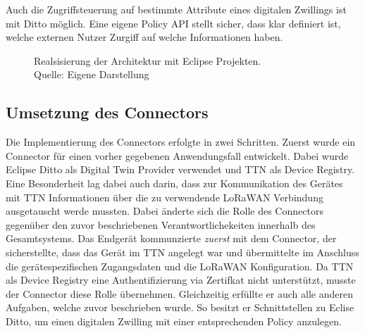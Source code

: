 Auch die Zugriffsteuerung auf bestimmte Attribute eines digitalen Zwillings ist mit Ditto möglich. Eine eigene Policy API stellt sicher, dass klar definiert ist, welche externen Nutzer Zurgiff auf welche Informationen haben. 

\begin{figure}
    \centering
    \caption[Realisierung der Architektur mit Eclipse Projekten]{Realsisierung der Architektur mit Eclipse Projekten.\\Quelle: Eigene Darstellung}
\end{figure}

\subsection{Umsetzung des Connectors}

Die Implementierung des Connectors erfolgte in zwei Schritten. Zuerst wurde ein Connector für einen vorher gegebenen Anwendungsfall entwickelt. Dabei wurde Eclipse Ditto als Digital Twin Provider verwendet und \ac{TTN} als Device Registry. Eine Besonderheit lag dabei auch darin, dass zur Kommunikation des Gerätes mit \ac{TTN} Informationen über die zu verwendende LoRaWAN Verbindung ausgetauscht werde mussten. Dabei änderte sich die Rolle des Connectors gegenüber den zuvor beschriebenen Verantwortlichekeiten innerhalb des Gesamtsystems. Das Endgerät kommunzierte \textit{zuerst} mit dem Connector, der sicherstellte, dass das Gerät im \ac{TTN} angelegt war und übermittelte im Anschluss die gerätespezifischen Zugangsdaten und die LoRaWAN Konfiguration. Da \ac{TTN} als Device Registry eine Authentifizierung via Zertifkat nicht unterstützt, musste der Connector diese Rolle übernehmen. Gleichzeitig erfüllte er auch alle anderen Aufgaben, welche zuvor beschrieben wurde. So besitzt er Schnittstellen zu Eclise Ditto, um einen digitalen Zwilling mit einer entsprechenden Policy anzulegen.

